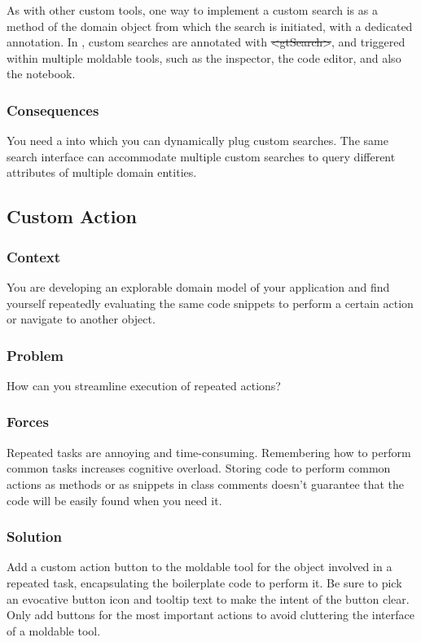 \documentclass[sigconf]{acmart}
\newcommand\on[1]{\nbc{ON}{#1}{olive}} %
\newcommand{\pattern}[1]{\emph{\nameref{pat:#1}}\xspace}
\newcommand{\GT}{\lst{GT}\xspace} %
\begin{document}
As with other custom tools, one way to implement a custom search is as a method of the domain object from which the search is initiated, with a dedicated annotation.
In \GT, custom searches are annotated with \st{<gtSearch>}, and triggered within multiple moldable tools, such as the inspector, the code editor, and also the notebook.

\subsubsection*{Consequences}
You need a \pattern{moldableTool} into which you can dynamically plug custom searches.
The same search interface can accommodate multiple custom searches to query different attributes of multiple domain entities.

\subsection*{Custom Action}\label{pat:customAction}
\subsubsection*{Context}
You are developing an explorable domain model of your application and find yourself repeatedly evaluating the same code snippets to perform a certain action or navigate to another object.

\subsubsection*{Problem}
How can you streamline execution of repeated actions?

\subsubsection*{Forces}
Repeated tasks are annoying and time-consuming.
Remembering how to perform common tasks increases cognitive overload.
Storing code to perform common actions as methods or as snippets in class comments doesn't guarantee that the code will be easily found when you need it.

\subsubsection*{Solution}
Add a custom action button to the moldable tool for the object involved in a repeated task, encapsulating the boilerplate code to perform it.
Be sure to pick an evocative button icon and tooltip text to make the intent of the button clear.
Only add buttons for the most important actions to avoid cluttering the interface of a moldable tool.
\end{document}

